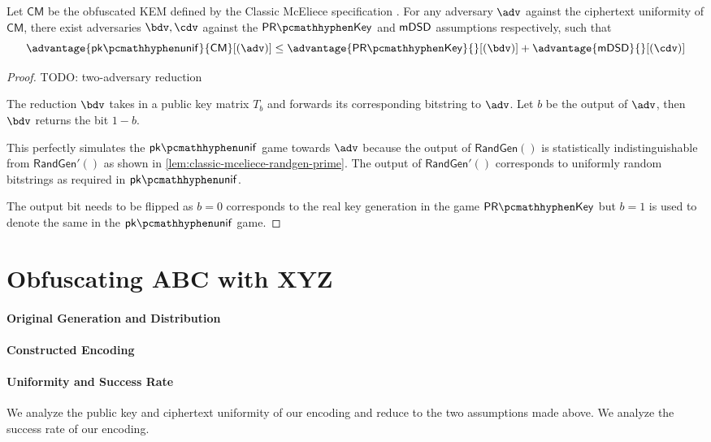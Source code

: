 \begin{lemma} \label{lem:classic-mceliece-ctxt-unif}
    Let $\textsf{CM}$ be the obfuscated KEM defined by the Classic McEliece specification \cite{NISTPQC-R4:ClassicMcEliece22}.
    For any adversary $\adv$ against the ciphertext uniformity of $\textsf{CM}$, there exist adversaries $\bdv, \cdv$ against the $\prkey$ and $\mathsf{mDSD}$ assumptions respectively, such that
    \[ \advantage{\pkunif}{\textsf{CM}}[(\adv)] \leq \advantage{\prkey}{}[(\bdv)] + \advantage{\mdsd}{}[(\cdv)] \]
\end{lemma}
\begin{proof}
    TODO: two-adversary reduction
    
    The reduction $\bdv$ takes in a public key matrix $T_b$ and forwards its corresponding bitstring to $\adv$. Let $b$ be the output of $\adv$, then $\bdv$ returns the bit $1-b$.

    This perfectly simulates the $\pkunif$ game towards $\adv$ because the output of $\textsf{RandGen}()$ is statistically indistinguishable from $\textsf{RandGen}'()$ as shown in \cref{lem:classic-mceliece-randgen-prime}. The output of $\textsf{RandGen}'()$ corresponds to uniformly random bitstrings as required in $\pkunif$.

    The output bit needs to be flipped as $b=0$ corresponds to the real key generation in the game $\prkey$ but $b=1$ is used to denote the same in the $\pkunif$ game.
\end{proof}

\section{Obfuscating ABC with XYZ} \label{sec:tbd}
\paragraph{Original Generation and Distribution}
\paragraph{Constructed Encoding}
\paragraph{Uniformity and Success Rate}

We analyze the public key and ciphertext uniformity of our encoding and reduce to the two assumptions made above. We analyze the success rate of our encoding.

